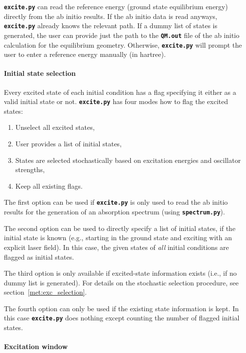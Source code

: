 \documentclass[a4paper,11pt,DIV=15,openany,twoside=false]{scrbook}
\newcommand{\ttt}[1]{\textbf{\texttt{#1}}}
\begin{document}
\ttt{excite.py} can read the reference energy (ground state equilibrium energy) directly from the ab initio results. If the ab initio data is read anyways, \ttt{excite.py} already knows the relevant path. If a dummy list of states is generated, the user can provide just the path to the \ttt{QM.out} file of the ab initio calculation for the equilibrium geometry. Otherwise, \ttt{excite.py} will prompt the user to enter a reference energy manually (in hartree).

\paragraph{Initial state selection}

Every excited state of each initial condition has a flag specifying it either as a valid initial state or not. \ttt{excite.py} has four modes how to flag the excited states:
\begin{enumerate}
  \item Unselect all excited states,
  \item User provides a list of initial states,
  \item States are selected stochastically based on excitation energies and oscillator strengths,
  \item Keep all existing flags.
\end{enumerate}
The first option can be used if \ttt{excite.py} is only used to read the ab initio results for the generation of an absorption spectrum (using \ttt{spectrum.py}). 

The second option can be used to directly specify a list of initial states, if the initial state is known (e.g., starting in the ground state and exciting with an explicit laser field). In this case, the given states of \textit{all} initial conditions are flagged as initial states.

The third option is only available if excited-state information exists (i.e., if no dummy list is generated). For details on the stochastic selection procedure, see section~\ref{met:exc_selection}. 

The fourth option can only be used if the existing state information is kept. In this case \ttt{excite.py} does nothing except counting the number of flagged initial states.

\paragraph{Excitation window}
\end{document}
